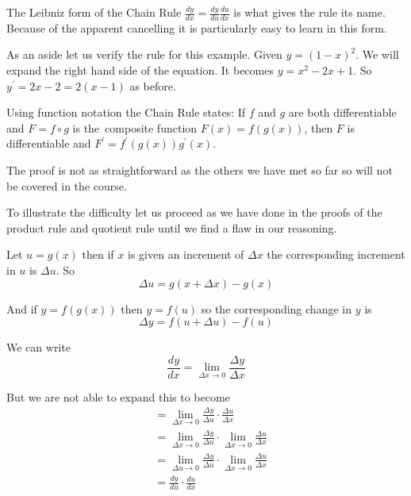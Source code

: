 The Leibniz form of the Chain Rule $\frac{d y}{d x} =\frac{d y}{d u} \frac{d u}{d x}$ is what gives the rule its name. Because of the apparent cancelling it is particularly
easy to learn in this form. 

As an aside let us verify the rule for this example. Given
$y =(1 -x)^{2}$. We will expand the right hand side of the equation. It
becomes $y =x^{2} -2 x +1$. So $y^{ \prime } =2 x -2 =2 (x -1)$ as before. 

Using function notation the Chain Rule states: If $f$ and $g$ are both differentiable and $F =f \circ g$ is the\ composite function $F (x) =f (g (x))$, then $F$ is differentiable and $F^{ \prime } =f^{ \prime } (g (x)) g^{ \prime } (x)$. 

The proof is not as straightforward as the others we have met so far so will not be covered in the course. 

To illustrate the difficulty let us proceed as we have done in the proofs of the product rule and quotient rule until we find a flaw in our reasoning.


Let $u =g (x)$ then if $x$ is given an increment of $ \Delta x$ the corresponding increment in $u$ is $ \Delta u$. So
\begin{equation*} \Delta u =g (x + \Delta x) -g (x)
\end{equation*}

And if $y =f (g (x))$ then $y =f (u)$ so the corresponding change in $y$ is
\begin{equation*} \Delta y =f (u + \Delta u) -f (u)
\end{equation*}

We can write
\begin{equation*}\frac{d y}{d x} =\underset{ \Delta x \rightarrow 0}{\lim }\frac{ \Delta y}{ \Delta x}
\end{equation*}

But we are not able to expand this to become
\begin{align*} &  = \underset{ \Delta x \rightarrow 0}{\lim }\frac{ \Delta y}{ \Delta u} \cdot \frac{ \Delta u}{ \Delta x} \\
 &  = \underset{ \Delta x \rightarrow 0}{\lim }\frac{ \Delta y}{ \Delta u} \cdot \underset{ \Delta x \rightarrow 0}{\lim } \frac{ \Delta u}{ \Delta x} \\
 &  = \underset{ \Delta u \rightarrow 0}{\lim }\frac{ \Delta y}{ \Delta u} \cdot \underset{ \Delta x \rightarrow 0}{\lim } \frac{ \Delta u}{ \Delta x} \\
 &  = \frac{d y}{d u} \cdot \frac{d u}{d x}\end{align*}

